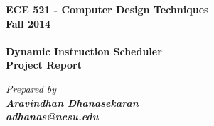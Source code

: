 \documentclass[a4paper]{article}
\date{}                             %
\begin{document}
    \begin{titlepage}
        \vspace*{\fill}
        \begin{center}
            {\huge \bf ECE 521 - Computer Design Techniques \\ Fall 2014 \\ \vspace {8 mm} \\ \LARGE \bf Dynamic Instruction Scheduler \\ \vspace{4 mm} Project Report}
            
            {\vspace{9 mm} \it \large Prepared by \\ \bf \Large Aravindhan Dhanasekaran\\ \bf \large adhanas@ncsu.edu}
        \end{center}
        \vspace*{\fill}
    \end{titlepage}


\newpage
\tableofcontents
\listoffigures
\listoftables
\newpage
{}








\end{document}
